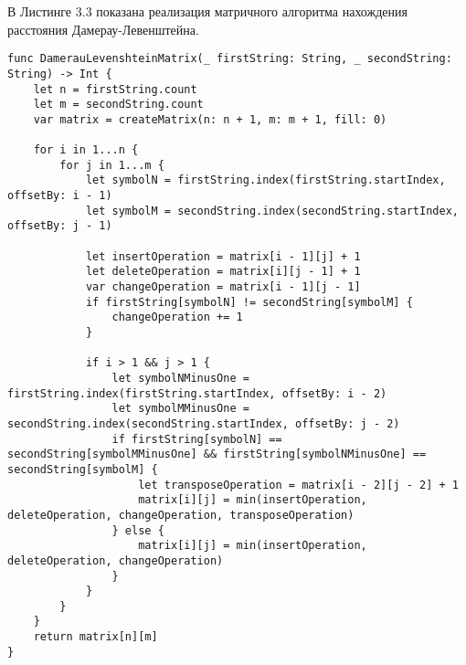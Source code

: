 В Листинге 3.3 показана реализация матричного алгоритма нахождения расстояния Дамерау-Левенштейна.
\begin{lstlisting}[caption=Функция нахождения расстояния Дамерау-Левенштейна матрично]
func DamerauLevenshteinMatrix(_ firstString: String, _ secondString: String) -> Int {
    let n = firstString.count
    let m = secondString.count
    var matrix = createMatrix(n: n + 1, m: m + 1, fill: 0)
    
    for i in 1...n {
        for j in 1...m {
            let symbolN = firstString.index(firstString.startIndex, offsetBy: i - 1)
            let symbolM = secondString.index(secondString.startIndex, offsetBy: j - 1)
            
            let insertOperation = matrix[i - 1][j] + 1
            let deleteOperation = matrix[i][j - 1] + 1
            var changeOperation = matrix[i - 1][j - 1]
            if firstString[symbolN] != secondString[symbolM] {
                changeOperation += 1
            }
         
            if i > 1 && j > 1 {
                let symbolNMinusOne = firstString.index(firstString.startIndex, offsetBy: i - 2)
                let symbolMMinusOne = secondString.index(secondString.startIndex, offsetBy: j - 2)
                if firstString[symbolN] == secondString[symbolMMinusOne] && firstString[symbolNMinusOne] == secondString[symbolM] {
                    let transposeOperation = matrix[i - 2][j - 2] + 1
                    matrix[i][j] = min(insertOperation, deleteOperation, changeOperation, transposeOperation)
                } else {
                    matrix[i][j] = min(insertOperation, deleteOperation, changeOperation)
                }
            }
        }
    }
    return matrix[n][m]
}
\end{lstlisting}

